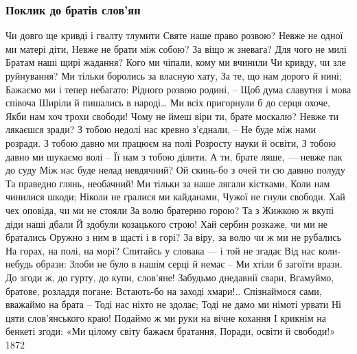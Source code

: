  
 
 

\subsubsection{Поклик до братів слов’ян}
\label{sec:poetry.rus.mihailo_staryckii.poklyk_do_brativ_slovjan}


Чи довго ще кривді і гвалту тлумити
Святе наше право розвою?
Невже не одної ми матері діти,
Невже не брати між собою?
За віщо ж зневага? Для чого не милі
Братам наші щирі жадання?
Кого ми чіпали, кому ми вчинили
Чи кривду, чи зле руйнування?
Ми тільки боролись за власную хату,
За те, що нам дорого й нині;
Бажаємо ми і тепер небагато:
Рідного розвою родині, –
Щоб дума славутня і мова співоча
Ширіли й пишались в народі…
Ми всіх пригорнули б до серця охоче,
Якби нам хоч трохи свободи!
Чому не ймеш віри ти, брате москалю?
Невже ти лякаєшся зради?
З тобою недолі нас кревно з’єднали, –
Не буде між нами розради.
З тобою давно ми працюєм на полі
Розросту науки й освіти,
З тобою давно ми шукаємо волі –
Її нам з тобою ділити.
А ти, брате ляше, --- невже пак до суду
Між нас буде нелад невдячний?
Ой скинь-бо з очей ти сю давню полуду
Та праведно глянь, необачний!
Ми тільки за наше лягали кістками,
Коли нам чинилися шкоди;
Ніколи не гралися ми кайданами,
Чужої не гнули свободи.
Хай чех оповіда, чи ми не стояли
За волю братерню горою?
Та з Жижкою ж вкупі діди наші дбали
Й здобули козацького строю!
Хай сербин розкаже, чи ми не братались
Оружно з ним в щасті і в горі?
За віру, за волю чи ж ми не рубались
На горах, на полі, на морі?
Спитайсь у словака --- і той не згадає
Від нас коли-небудь образи:
Злоби не було в нашім серці й немає –
Ми хтіли б загоїти врази.
До згоди ж, до гурту, до купи, слов’яне!
Забудьмо днедавнії свари,
Вгамуймо, братове, розладдя погане:
Встають-бо на заході хмари!..
Спізнаймося сами, вважаймо на брата –
Тоді нас ніхто не здолає;
Тоді не дамо ми німоті урвати
Ні цяти слов’янського краю!
Подаймо ж ми руки на вічне кохання
І крикнім на бенкеті згоди:
«Ми цілому світу бажаєм братання,
Поради, освіти й свободи!»
1872 
